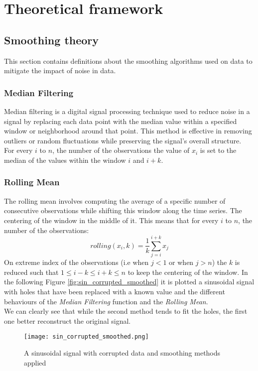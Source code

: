 \chapter{Theoretical framework}
\label{sec:theoretical_framework}

\section{Smoothing theory}
This section contains definitions about the smoothing algorithms used on data to mitigate the impact of noise in data.

\subsection{Median Filtering}
Median filtering is a digital signal processing technique used to reduce noise in a signal by replacing each data point with the median value within a specified window or neighborhood around that point. 
This method is effective in removing outliers or random fluctuations while preserving the signal's overall structure.\\
For every $i$ to $n$, the number of the observations the value of $x_i$ is set to the median of the values within the window $i$ and $i+k$.

\subsection{Rolling Mean}
The rolling mean involves computing the average of a specific number of consecutive observations while shifting this window along the time series.
The centering of the window in the middle of it.
This means that for every $i$ to $n$, the number of the observations:
\begin{equation}
  rolling(x_i,k) = \frac{1}{k} \sum_{j=i}^{i+k} x_j
  \label{eq:rolling_mean}
\end{equation}
On extreme index of the observations (i.e when $j < 1$ or when $j > n$) the $k$ is reduced such that $1 \leq i-k \leq i+k \leq n$ to keep the centering of the window.
In the following Figure \ref{fig:sin_corrupted_smoothed} it is plotted a sinusoidal signal with holes that have been replaced with a known value and the different behaviours of the \textit{Median Filtering} function and the \textit{Rolling Mean}. \\
We can clearly see that while the second method tends to fit the holes, the first one better reconstruct the original signal.
\begin{figure}[H]
  \centering  
    \texttt{[image: sin\_corrupted\_smoothed.png]}
    \caption{A sinusoidal signal with corrupted data and smoothing methods applied}
    \label{fig:sin_corrupted_smooted}
\end{figure}



